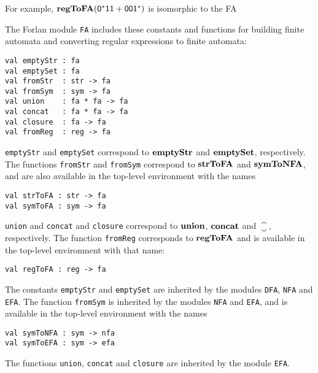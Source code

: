 For example, $\mathbf{regToFA}(\mathsf{0^*11+001^*})$ is isomorphic to
the FA
\begin{center}

\end{center}

The Forlan module \texttt{FA} includes these constants and functions
for building finite automata and converting regular expressions to
finite automata:
\begin{verbatim}
val emptyStr : fa
val emptySet : fa
val fromStr  : str -> fa
val fromSym  : sym -> fa
val union    : fa * fa -> fa
val concat   : fa * fa -> fa
val closure  : fa -> fa
val fromReg  : reg -> fa
\end{verbatim}
%
%
%
%
%
%
%
%
\texttt{emptyStr} and \texttt{emptySet} correspond to $\mathbf{emptyStr}$ and
$\mathbf{emptySet}$, respectively.
The functions \texttt{fromStr} and \texttt{fromSym} correspond to
$\mathbf{strToFA}$ and $\mathbf{symToNFA}$, and are also available in the top-level
environment with the names
\begin{verbatim}
val strToFA : str -> fa
val symToFA : sym -> fa
\end{verbatim}
%
%
\texttt{union} and \texttt{concat} and \texttt{closure} correspond to
$\mathbf{union}$, $\mathbf{concat}$ and $\closure$, respectively.
The function \texttt{fromReg} corresponds to $\mathbf{regToFA}$ and is
available in the top-level environment with that name:
\begin{verbatim}
val regToFA : reg -> fa
\end{verbatim}
%
The constants \texttt{emptyStr} and \texttt{emptySet} are inherited by
the modules \texttt{DFA}, \texttt{NFA} and \texttt{EFA}.
%
%
%
%
%
%
The function \texttt{fromSym} is inherited by
the modules \texttt{NFA} and \texttt{EFA}, and is available in
%
%
the top-level environment with the names
\begin{verbatim}
val symToNFA : sym -> nfa
val symToEFA : sym -> efa
\end{verbatim}
%
%
The functions \texttt{union}, \texttt{concat} and \texttt{closure} are
inherited by the module \texttt{EFA}.
%
%
%

